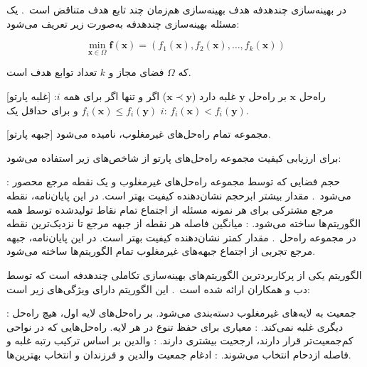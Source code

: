 



در بهینه‌سازی چندهدفه
هدف بهینه‌سازی هم‌زمان چند تابع هدف متناقض است~\cite{deb2001multi}.
یک مسئله بهینه‌سازی چندهدفه به‌صورت زیر تعریف می‌شود:

\begin{equation}
\min_{\mathbf{x} \in \Omega} \mathbf{f}(\mathbf{x}) = (f_1(\mathbf{x}), f_2(\mathbf{x}), \dots, f_k(\mathbf{x}))
\end{equation}

که $\Omega$ فضای مجاز و $k$ تعداد توابع هدف است.

[غلبه پارتو]
راه‌حل $\mathbf{x}$ بر راه‌حل $\mathbf{y}$ غلبه دارد ($\mathbf{x} \prec \mathbf{y}$)
اگر و تنها اگر برای همه $i$: $f_i(\mathbf{x}) \le f_i(\mathbf{y})$
و برای حداقل یک $i$: $f_i(\mathbf{x}) < f_i(\mathbf{y})$.

[جبهه پارتو]
مجموعه تمام راه‌حل‌های غیرمغلوب،  نامیده می‌شود.



برای ارزیابی کیفیت مجموعه راه‌حل‌های پارتو از شاخص‌های زیر استفاده می‌شود:

:
حجم فضایی که توسط مجموعه راه‌حل‌های غیرمغلوب و یک نقطه مرجع محصور می‌شود~\cite{zitzler2003performance}.
مقدار بیشتر ابرحجم نشان‌دهنده کیفیت بهتر است.
در این پایان‌نامه، نقطه مرجع مشترکی برای هر نمونه مسئله از اجتماع تمام نقاط تولیدشده توسط همه الگوریتم‌ها ساخته می‌شود.
:
میانگین فاصله هر نقطه از جبهه مرجع تا نزدیک‌ترین نقطه در مجموعه راه‌حل~\cite{zitzler2003performance}.
مقدار کمتر  نشان‌دهنده کیفیت بهتر است.
در این پایان‌نامه، جبهه مرجع تجربی از اجتماع جبهه‌های غیرمغلوب تمام الگوریتم‌ها ساخته می‌شود.



الگوریتم 
یکی از پرکاربردترین الگوریتم‌های بهینه‌سازی تکاملی چندهدفه است
که توسط دب و همکاران ارائه شده است~\cite{deb2002fast}.
این الگوریتم دارای ویژگی‌های زیر است:

 : جمعیت به لایه‌های غیرمغلوب دسته‌بندی می‌شود.
بر راه‌حل‌های لایه اول، هیچ راه‌حل دیگری غلبه نمی‌کند.
 : معیاری برای حفظ تنوع در هر لایه.
راه‌حل‌هایی که در نواحی کم‌جمعیت‌تر قرار دارند، ارجحیت بیشتری دارند.
 : والدین بر اساس ترکیب رتبه غلبه و فاصله ازدحام انتخاب می‌شوند.
 : ادغام جمعیت والدین و فرزندان و انتخاب بهترین‌ها.


